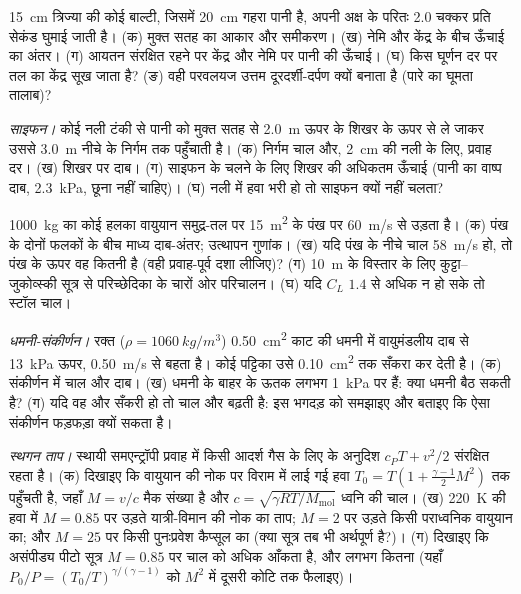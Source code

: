 \begin{exercise}[$\star\star$]\label{exo:b2:euler-bernoulli:6}
\qty{15}{cm} त्रिज्या की कोई बाल्टी, जिसमें \qty{20}{cm} गहरा पानी है, अपनी
अक्ष के परितः \num{2.0} चक्कर प्रति सेकंड घुमाई जाती है। (क) मुक्त सतह का आकार और
समीकरण। (ख) नेमि और केंद्र के बीच ऊँचाई का अंतर। (ग) आयतन
संरक्षित रहने पर केंद्र और नेमि पर पानी की ऊँचाई। (घ) किस
घूर्णन दर पर तल का केंद्र सूख जाता है? (ङ) वही परवलयज उत्तम
दूरदर्शी-दर्पण क्यों बनाता है (पारे का घूमता तालाब)?
\end{exercise}

\begin{exercise}[$\star\star$]\label{exo:b2:euler-bernoulli:7}
\emph{साइफन।} कोई नली टंकी से पानी को मुक्त सतह से \qty{2.0}{m} ऊपर के
शिखर के ऊपर से ले जाकर उससे \qty{3.0}{m} नीचे के निर्गम तक पहुँचाती है। (क) निर्गम चाल
और, \qty{2}{cm} की नली के लिए, प्रवाह दर। (ख) शिखर पर दाब। (ग)
साइफन के चलने के लिए शिखर की अधिकतम ऊँचाई (पानी का वाष्प
दाब, \qty{2.3}{kPa}, छूना नहीं चाहिए)। (घ) नली में हवा भरी हो तो साइफन
क्यों नहीं चलता?
\end{exercise}

\begin{exercise}[$\star\star$]\label{exo:b2:euler-bernoulli:8}
\qty{1000}{kg} का कोई हलका वायुयान समुद्र-तल पर \qty{15}{m^2} के पंख पर
\qty{60}{m/s} से उड़ता है। (क) पंख के दोनों फलकों के बीच
माध्य दाब-अंतर; उत्थापन गुणांक। (ख) यदि पंख के नीचे चाल
\qty{58}{m/s} हो, तो पंख के ऊपर वह कितनी है (वही प्रवाह-पूर्व
दशा लीजिए)? (ग) \qty{10}{m} के विस्तार के लिए कुट्टा--जुकोव्स्की सूत्र से
परिच्छेदिका के चारों ओर परिचालन। (घ) यदि
$C_L$ $1.4$ से अधिक न हो सके तो स्टॉल चाल।
\end{exercise}

\begin{exercise}[$\star\star$]\label{exo:b2:euler-bernoulli:9}
\emph{धमनी-संकीर्णन।} रक्त ($\rho = \qty{1060}{kg/m^3}$) \qty{0.50}{cm^2} काट की
धमनी में वायुमंडलीय दाब से \qty{13}{kPa} ऊपर, \qty{0.50}{m/s} से
बहता है। कोई पट्टिका उसे \qty{0.10}{cm^2} तक सँकरा कर देती है। (क) संकीर्णन में
चाल और दाब। (ख) धमनी के बाहर के ऊतक लगभग
\qty{1}{kPa} पर हैं: क्या धमनी बैठ सकती है? (ग) यदि वह और सँकरी हो तो चाल
और बढ़ती है: इस भगदड़ को समझाइए और बताइए कि ऐसा संकीर्णन फड़फड़ा क्यों सकता है।
\end{exercise}

\begin{exercise}[$\star\star\star$]\label{exo:b2:euler-bernoulli:10}
\emph{स्थगन ताप।} स्थायी समएन्ट्रॉपी प्रवाह में किसी आदर्श गैस के लिए
 के अनुदिश $c_PT + v^2/2$ संरक्षित रहता है। (क) दिखाइए कि
वायुयान की नोक पर विराम में लाई गई हवा $T_0 = T(1 +
\tfrac{\gamma - 1}{2}M^2)$ तक पहुँचती है, जहाँ $M = v/c$ मैक संख्या है और $c =
\sqrt{\gamma RT/M_{\text{mol}}}$ ध्वनि की चाल। (ख) \qty{220}{K} की हवा में
$M = 0.85$ पर उड़ते यात्री-विमान की नोक का ताप; $M = 2$ पर उड़ते किसी
पराध्वनिक वायुयान का; और $M = 25$ पर किसी पुनःप्रवेश कैप्सूल का (क्या सूत्र
तब भी अर्थपूर्ण है?)। (ग) दिखाइए कि असंपीड्य पीटो सूत्र
$M = 0.85$ पर चाल को अधिक आँकता है, और लगभग कितना (यहाँ
$P_0/P = (T_0/T)^{\gamma/(\gamma - 1)}$ को $M^2$ में दूसरी कोटि तक फैलाइए)।
\end{exercise}

